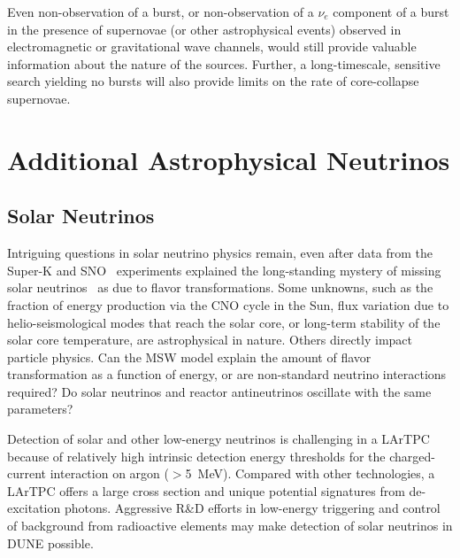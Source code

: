 Even non-observation of a burst, or non-observation of
a $\nu_e$ component of a burst in the presence of supernovae (or other
astrophysical events) observed in electromagnetic or gravitational
wave channels, would still provide valuable information about the
nature of the sources.  Further, a long-timescale, sensitive search
yielding no bursts will also provide limits on the rate of
core-collapse supernovae.







\section{Additional Astrophysical Neutrinos}
\label{sec:physics-snblowe-other}

\subsection{Solar Neutrinos}

Intriguing questions in solar neutrino physics remain,
even after data
from the Super-K and SNO~\cite{Fukuda:2001nj,Ahmad:2001an}
experiments explained the long-standing mystery of missing solar
neutrinos~\cite{Cleveland:1998nv} as due to flavor
transformations. 
Some unknowns, such as the fraction of energy production via the CNO
cycle in the Sun, flux variation due to helio-seismological modes that
reach the solar core, or long-term stability of the solar core
temperature, are astrophysical in nature. Others directly impact
particle physics. Can the MSW model explain the amount of flavor
transformation as a function of energy, or are non-standard neutrino
interactions required?  Do solar neutrinos and reactor antineutrinos
oscillate with the same parameters? 

Detection of solar and other low-energy neutrinos is challenging in
a LArTPC because of relatively high intrinsic detection energy thresholds for
the charged-current interaction on argon ($>$\SI{5}{\MeV}). 
Compared with other technologies, a LArTPC offers a large
cross section and unique potential signatures from de-excitation
photons. Aggressive R\&D efforts in low-energy triggering and
control of background from radioactive elements may make detection
of solar neutrinos in DUNE possible.


